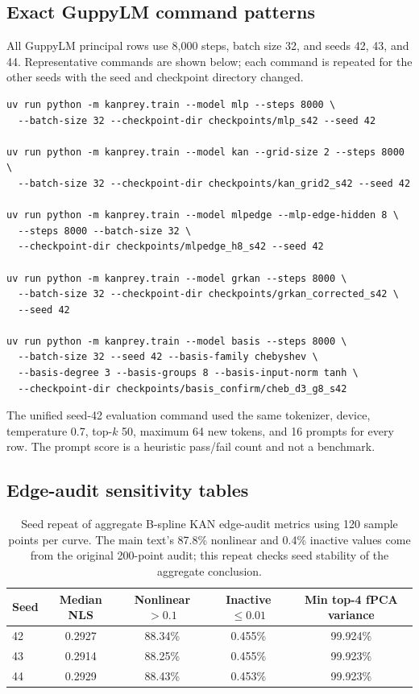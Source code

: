 \documentclass{article}
\begin{document}
\subsection{Exact GuppyLM command patterns}

All GuppyLM principal rows use 8,000 steps, batch size 32, and seeds 42, 43, and 44. Representative commands are shown below; each command is repeated for the other seeds with the seed and checkpoint directory changed.

\begin{verbatim}
uv run python -m kanprey.train --model mlp --steps 8000 \
  --batch-size 32 --checkpoint-dir checkpoints/mlp_s42 --seed 42

uv run python -m kanprey.train --model kan --grid-size 2 --steps 8000 \
  --batch-size 32 --checkpoint-dir checkpoints/kan_grid2_s42 --seed 42

uv run python -m kanprey.train --model mlpedge --mlp-edge-hidden 8 \
  --steps 8000 --batch-size 32 \
  --checkpoint-dir checkpoints/mlpedge_h8_s42 --seed 42

uv run python -m kanprey.train --model grkan --steps 8000 \
  --batch-size 32 --checkpoint-dir checkpoints/grkan_corrected_s42 \
  --seed 42

uv run python -m kanprey.train --model basis --steps 8000 \
  --batch-size 32 --seed 42 --basis-family chebyshev \
  --basis-degree 3 --basis-groups 8 --basis-input-norm tanh \
  --checkpoint-dir checkpoints/basis_confirm/cheb_d3_g8_s42
\end{verbatim}

The unified seed-42 evaluation command used the same tokenizer, device, temperature 0.7, top-\(k\) 50, maximum 64 new tokens, and 16 prompts for every row. The prompt score is a heuristic pass/fail count and not a benchmark.

\subsection{Edge-audit sensitivity tables}

\begin{table}[htbp]
\centering
\caption{Seed repeat of aggregate B-spline KAN edge-audit metrics using 120 sample points per curve. The main text's 87.8\% nonlinear and 0.4\% inactive values come from the original 200-point audit; this repeat checks seed stability of the aggregate conclusion.}
\label{tab:edge-stability}
\begin{tabular}{@{}lcccc@{}}
\toprule
Seed & Median NLS & Nonlinear \(>0.1\) & Inactive \(\leq0.01\) & Min top-4 fPCA variance \\
\midrule
42 & 0.2927 & 88.34\% & 0.455\% & 99.924\% \\
43 & 0.2914 & 88.25\% & 0.455\% & 99.923\% \\
44 & 0.2929 & 88.43\% & 0.453\% & 99.923\% \\
\bottomrule
\end{tabular}
\end{table}
\end{document}
